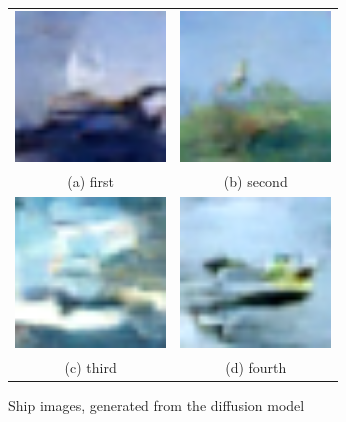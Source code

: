 \documentclass[conference]{IEEEtran}
\begin{document}
  \begin{figure}
    \begin{tabular}{cc}
      \includegraphics[width=40mm]{./images/generated-imgs/ship/0816.png} 
  &   \includegraphics[width=40mm]{./images/generated-imgs/ship/0817.png} 
  \\
    (a) first 
    & (b) second \\[6pt]
       \includegraphics[width=40mm]{./images/generated-imgs/ship/0818.png} 
    &  \includegraphics[width=40mm]{./images/generated-imgs/ship/0819.png} 
  \\
    (c) third & (d) fourth \\[6pt]
    \end{tabular}
    \caption{Ship images, generated from the diffusion model}
    \end{figure}
\end{document}

